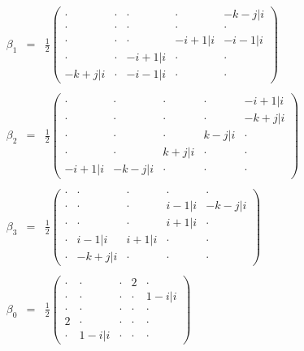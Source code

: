 \begin{eqnarray}
\begin{array}{ccc}
\beta_{1} & = & \frac{1}{2} \left( \begin{array}{ccccc}
\cdot & \cdot & \cdot & \cdot & -k-j\vert i\\
\cdot & \cdot & \cdot & \cdot & \cdot\\
\cdot & \cdot & \cdot & -i+1\vert i & -i-1\vert i\\
\cdot & \cdot & -i+1\vert i & \cdot & \cdot\\
-k+j\vert i & \cdot & -i-1\vert i & \cdot & \cdot
\end{array} \right)\\ \\
\beta_{2} & = & \frac{1}{2} \left( \begin{array}{ccccc}
\cdot & \cdot & \cdot & \cdot & -i+1\vert i\\
\cdot & \cdot & \cdot & \cdot & -k+j\vert i\\
\cdot & \cdot & \cdot & k-j\vert i & \cdot\\
\cdot & \cdot & k+j\vert i & \cdot & \cdot\\
-i+1\vert i & -k-j\vert i & \cdot & \cdot & \cdot
\end{array} \right)\\ \\
\beta_{3} & = & \frac{1}{2} \left( \begin{array}{ccccc}
\cdot & \cdot & \cdot & \cdot & \cdot\\
\cdot & \cdot & \cdot & i-1\vert i & -k-j\vert i\\
\cdot & \cdot & \cdot & i+1\vert i & \cdot\\
\cdot & i-1\vert i & i+1\vert i & \cdot & \cdot\\
\cdot & -k+j\vert i & \cdot & \cdot & \cdot
\end{array} \right)\\ \\
\beta_{0} & = & \frac{1}{2} \left( \begin{array}{ccccc}
\cdot & \cdot & \cdot & 2 & \cdot\\
\cdot & \cdot & \cdot & \cdot & 1-i\vert i\\
\cdot & \cdot & \cdot & \cdot & \cdot\\
2 & \cdot & \cdot & \cdot & \cdot\\
\cdot & 1-i\vert i & \cdot & \cdot & \cdot \end{array} \right)
\end{array}
\end{eqnarray}

